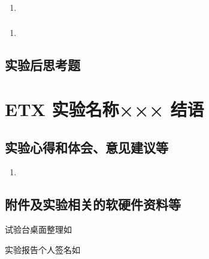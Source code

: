 \documentclass[dvipsnames, svgnames,a4paper,11pt]{article}
\begin{document}
	\subsubsection{}
	\begin{enumerate}
		\item 
	\end{enumerate}
	
	\subsubsection{}
	\begin{enumerate}
		\item 
	\end{enumerate}
	
	\subsubsection{}
	
	
	\subsection{实验后思考题}
	
	\begin{question}
		
	\end{question}
	
	\begin{question}
		
	\end{question}
	
	\begin{question}
		
	\end{question}
	
	
	
	\clearpage
	
	\section{ETX 实验名称××× \quad\heiti 结语}
	
	\subsection{实验心得和体会、意见建议等}
	\begin{enumerate}
		\item 
	\end{enumerate}
	

	\subsection{附件及实验相关的软硬件资料等}
	试验台桌面整理如%
	
	实验报告个人签名如

	
	
\end{document}
